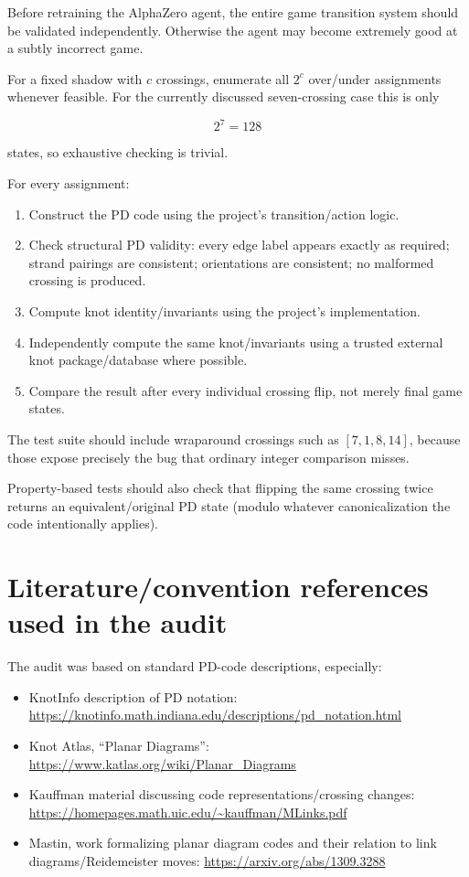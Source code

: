 \documentclass[11pt]{article}
\begin{document}
Before retraining the AlphaZero agent, the entire game transition system should be validated independently. Otherwise the agent may become extremely good at a subtly incorrect game.

For a fixed shadow with \(c\) crossings, enumerate all \(2^c\) over/under assignments whenever feasible. For the currently discussed seven-crossing case this is only

\[
2^7 = 128
\]

states, so exhaustive checking is trivial.

For every assignment:

\begin{enumerate}[label=\arabic*.]
    \item Construct the PD code using the project's transition/action logic.
    \item Check structural PD validity: every edge label appears exactly as required; strand pairings are consistent; orientations are consistent; no malformed crossing is produced.
    \item Compute knot identity/invariants using the project's implementation.
    \item Independently compute the same knot/invariants using a trusted external knot package/database where possible.
    \item Compare the result after every individual crossing flip, not merely final game states.
\end{enumerate}

The test suite should include wraparound crossings such as \([7,1,8,14]\), because those expose precisely the bug that ordinary integer comparison misses.

Property-based tests should also check that flipping the same crossing twice returns an equivalent/original PD state (modulo whatever canonicalization the code intentionally applies).

\section{Literature/convention references used in the audit}

The audit was based on standard PD-code descriptions, especially:

\begin{itemize}
    \item KnotInfo description of PD notation: \url{https://knotinfo.math.indiana.edu/descriptions/pd_notation.html}
    \item Knot Atlas, ``Planar Diagrams'': \url{https://www.katlas.org/wiki/Planar_Diagrams}
    \item Kauffman material discussing code representations/crossing changes: \url{https://homepages.math.uic.edu/~kauffman/MLinks.pdf}
    \item Mastin, work formalizing planar diagram codes and their relation to link diagrams/Reidemeister moves: \url{https://arxiv.org/abs/1309.3288}
\end{itemize}
\end{document}
